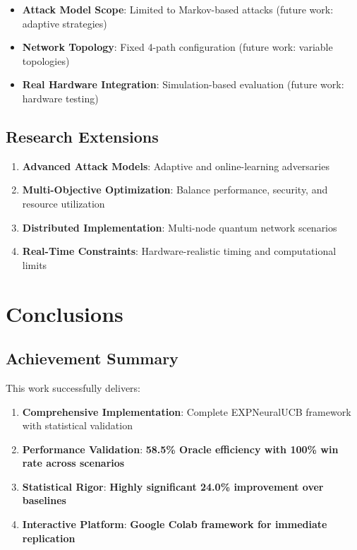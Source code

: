 \documentclass[11pt,a4paper]{article}
\newcommand{\performance}[1]{\textcolor{performancecolor}{\textbf{#1}}}
\newcommand{\success}[1]{\textcolor{successcolor}{\textbf{#1}}}
\newcommand{\colab}[1]{\textcolor{colabcolor}{\textbf{#1}}}
\begin{document}
\begin{itemize}
\item \textbf{Attack Model Scope}: Limited to Markov-based attacks (future work: adaptive strategies)
\item \textbf{Network Topology}: Fixed 4-path configuration (future work: variable topologies)
\item \textbf{Real Hardware Integration}: Simulation-based evaluation (future work: hardware testing)
\end{itemize}

\subsection{Research Extensions}

\begin{enumerate}
\item \textbf{Advanced Attack Models}: Adaptive and online-learning adversaries
\item \textbf{Multi-Objective Optimization}: Balance performance, security, and resource utilization
\item \textbf{Distributed Implementation}: Multi-node quantum network scenarios
\item \textbf{Real-Time Constraints}: Hardware-realistic timing and computational limits
\end{enumerate}

\section{Conclusions}

\subsection{Achievement Summary}

This work successfully delivers:

\begin{enumerate}
\item \textbf{Comprehensive Implementation}: Complete EXPNeuralUCB framework with statistical validation
\item \textbf{Performance Validation}: \performance{58.5\% Oracle efficiency with 100\% win rate across scenarios}
\item \textbf{Statistical Rigor}: \success{Highly significant 24.0\% improvement over baselines}
\item \textbf{Interactive Platform}: \colab{Google Colab framework for immediate replication}
\end{enumerate}
\end{document}
